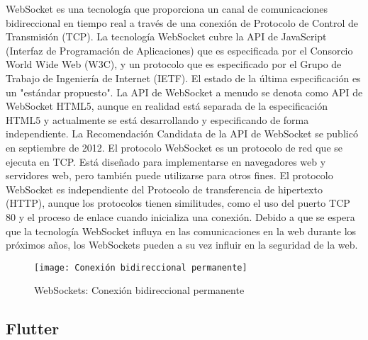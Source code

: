 \documentclass[]{article}
\begin{document}
WebSocket es una tecnología que proporciona un canal de comunicaciones bidireccional
en tiempo real a través de una conexión de Protocolo de Control de Transmisión (TCP). La tecnología WebSocket cubre la API de JavaScript (Interfaz de Programación de Aplicaciones) que es especificada por el Consorcio World Wide Web (W3C), y un protocolo que es especificado por el Grupo de Trabajo de Ingeniería de Internet (IETF). El estado de la última especificación es un "estándar propuesto". La API de WebSocket a menudo se denota como API de WebSocket HTML5, aunque en realidad está separada de la especificación HTML5 y actualmente se está desarrollando y especificando de forma independiente. La Recomendación Candidata de la API de WebSocket se publicó en septiembre de 2012. El protocolo WebSocket es un protocolo de red que se ejecuta en TCP. Está diseñado para implementarse en navegadores web y servidores web, pero también puede utilizarse para otros fines. El protocolo WebSocket es independiente del Protocolo de transferencia de hipertexto (HTTP), aunque los protocolos tienen similitudes, como el uso del puerto TCP 80 y el proceso de enlace cuando inicializa una conexión. Debido a que se espera que la tecnología WebSocket influya en las comunicaciones en la
web durante los próximos años, los WebSockets pueden a su vez influir en la seguridad de la web\cite{erkkila2012websocket}. %

\begin{figure}[h]
	\centering
	\texttt{[image: Conexión bidireccional permanente]}%
	\caption{WebSockets: Conexión bidireccional permanente}%
	\label{w:websockets}%
\end{figure}

\subsection{Flutter}
\end{document}

